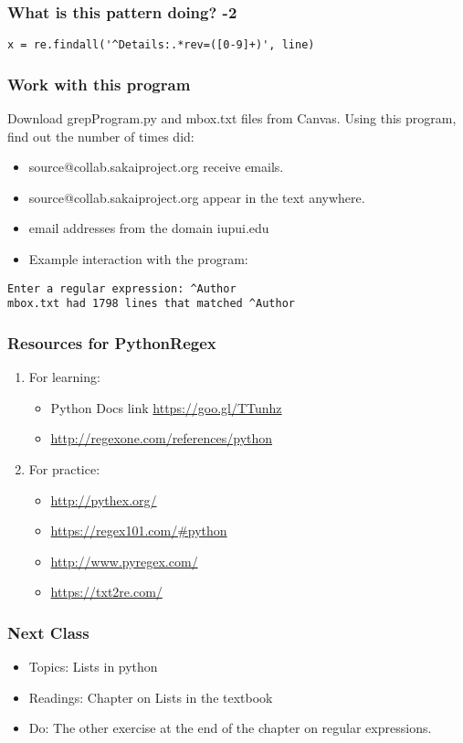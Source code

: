 \documentclass{beamer}
\begin{document}
\begin{frame}[fragile]
\frametitle{What is this pattern doing? -2}
\begin{verbatim}
x = re.findall('^Details:.*rev=([0-9]+)', line)
\end{verbatim}
\end{frame}

\begin{frame}[fragile]
\frametitle{Work with this program}
Download grepProgram.py and mbox.txt files from Canvas. Using this program, find out the number of times did:
\begin{itemize} 
\item source@collab.sakaiproject.org receive emails.
\item source@collab.sakaiproject.org appear in the text anywhere. 
\item email addresses from the domain iupui.edu
\item Example interaction with the program:
\end{itemize}
\begin{verbatim}
Enter a regular expression: ^Author
mbox.txt had 1798 lines that matched ^Author
\end{verbatim}
\end{frame}

\begin{frame}
\frametitle{Resources for PythonRegex}
\begin{enumerate}
\item For learning:
\begin{itemize}
\item Python Docs link \url{https://goo.gl/TTunhz}
\item \url{http://regexone.com/references/python}
\end{itemize}
\item For practice:
\begin{itemize}
\item \url{http://pythex.org/}
\item \url{https://regex101.com/\#python}
\item \url{http://www.pyregex.com/}
\item \url{https://txt2re.com/}
\end{itemize}
\end{enumerate}
\end{frame}

\begin{frame}
\frametitle{Next Class}
\begin{itemize}
\item Topics: Lists in python
\item Readings: Chapter on Lists in the textbook
\item Do: The other exercise at the end of the chapter on regular expressions.
\end{itemize}
\end{frame}
\end{document}
